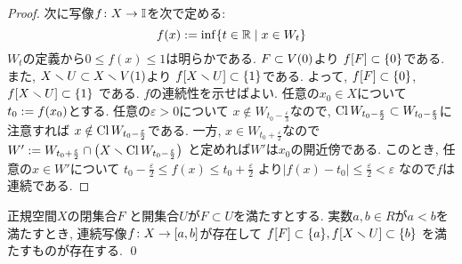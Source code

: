 \documentclass[uplatex, dvipdfmx, a4paper, 12pt, class=jsbook, crop=false]{standalone}
\begin{document}
\begin{proof}
	次に写像\( f\colon X\to\mathbb{I} \)を次で定める:
	\[ f(x) \defeq \inf  \setcomp{t \in \R}{x \in W_t} \]
	\( W_t \)の定義から\( 0 \leq f(x) \leq 1 \)は明らかである.
	\( F \subset V\lrparen{0} \)より
	\( \mapset{f}{F} \subset \lrbrace{0} \)である.
	また, \( X \setminus U \subset X \setminus V\lrparen{1} \)より
	\( \mapset{f}{X \setminus U} \subset \lrbrace{1} \)である.
	よって, \( \mapset{f}{F} \subset \lrbrace{0} \),
	\( \mapset{f}{X \setminus U} \subset \lrbrace{1} \)
	である.
	\( f \)の連続性を示せばよい.
	任意の\( x_0 \in X \)について\( t_0 \mathrel{:=} f(x_0) \)とする.
	任意の\( \varepsilon > 0 \)について
	\( x \notin W_{t_0 - \frac{\varepsilon}{3}} \)なので,
	\( \mathop{\mathrm{Cl}}\nolimits W_{t_0 - \frac{\varepsilon}{2}} \subset
	W_{t_0 - \frac{\varepsilon}{3}} \)に注意すれば
	\( x \notin \mathop{\mathrm{Cl}}\nolimits W_{t_0 - \frac{\varepsilon}{2}} \)である.
	一方, \( x \in W_{t_0 + \frac{\varepsilon}{2}} \)なので
	\( W' \defeq W_{t_0 + \frac{\varepsilon}{2}} \cap
	\lrparen{X \setminus \topcl W_{t_0 - \frac{\varepsilon}{2}}} \)
	と定めれば\( W' \)は\( x_0 \)の開近傍である.
	このとき, 任意の\( x \in W' \)について
	\( t_0 - \frac{\varepsilon}{2} \leq f(x) \leq t_0 + \frac{\varepsilon}{2} \)
	より\( |f(x) - t_0| \leq \frac{\varepsilon}{2} < \varepsilon \)
	なので\( f \)は連続である.
\end{proof}

\begin{corollary}
	正規空間\( X \)の閉集合\( F \)
	と開集合\( U \)が\( F \subset U \)を満たすとする.
	実数\( a, b \in R \)が\( a < b \)を満たすとき,
	連続写像\( f\colon X\to[a,b] \)が存在して
	\( \mapset{f}{F} \subset \lrbrace{a},
	\mapset{f}{X \setminus U} \subset \lrbrace{b} \)
	を満たすものが存在する.
	\qed
\end{corollary}
\end{document}
